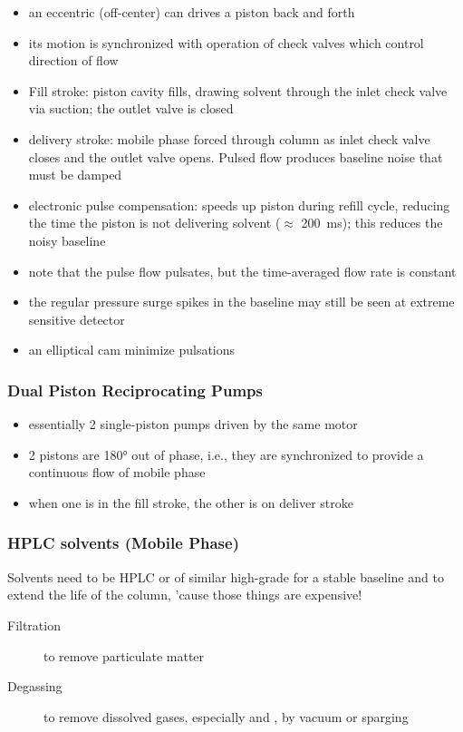 \documentclass[a4paper, 12pt]{article}
\begin{document}
\begin{itemize}
	\item an eccentric (off-center) can drives a piston back and forth
	\item its motion is synchronized with operation of check valves which control direction of flow
	\item Fill stroke: piston cavity fills, drawing solvent through the inlet check valve via suction; the outlet valve is closed
	\item delivery stroke: mobile phase forced through column as inlet check valve closes and the outlet valve opens. Pulsed flow produces baseline noise that must be damped
	\item electronic pulse compensation: speeds up piston during refill cycle, reducing the time the piston is not delivering solvent ($\approx$ \SI{200}{ms}); this reduces the noisy baseline
	\item note that the pulse flow pulsates, but the time-averaged flow rate is constant
	\item the regular pressure surge spikes in the baseline may still be seen at extreme sensitive detector
	\item an elliptical cam minimize pulsations
\end{itemize}

\subsubsection{Dual Piston Reciprocating Pumps}

\begin{itemize}
	\item essentially 2 single-piston pumps driven by the same motor
	\item 2 pistons are \ang{180} out of phase, i.e., they are synchronized to provide a continuous flow of mobile phase
	\item when one is in the fill stroke, the other is on deliver stroke
\end{itemize}

\subsubsection{HPLC solvents (Mobile Phase)}

Solvents need to be HPLC or of similar high-grade for a stable baseline and to extend the life of the column, 'cause those things are expensive!

\begin{description}
	\item[Filtration] to remove particulate matter
	\item[Degassing] to remove dissolved gases, especially  and , by vacuum or  sparging 
\end{description}
\end{document}
